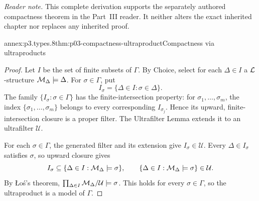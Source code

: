 \noindent\textit{Reader note.} This complete derivation supports the
separately authored compactness theorem in the Part~III reader.  It neither
alters the exact inherited chapter nor replaces any inherited proof.

\begin{annexitem}{annex:p3.types.8}{thm:p03-compactness-ultraproduct}{Compactness via ultraproducts}
\begin{proof}
Let \(I\) be the set of finite subsets of \(\Gamma\).  By Choice, select for
each \(\Delta\in I\) a \(\mathcal{L}\)-structure
\(\mathcal M_\Delta\models\Delta\).  For \(\sigma\in\Gamma\), put
\[
 I_\sigma=\{\Delta\in I:\sigma\in\Delta\}.
\]
The family \(\{I_\sigma:\sigma\in\Gamma\}\) has the finite-intersection
property: for \(\sigma_1,\ldots,\sigma_m\), the index
\(\{\sigma_1,\ldots,\sigma_m\}\) belongs to every corresponding
\(I_{\sigma_j}\).  Hence its upward, finite-intersection closure is a proper
filter.  The Ultrafilter Lemma extends it to an ultrafilter \(\mathcal U\).

For each \(\sigma\in\Gamma\), the generated filter and its extension give
\(I_\sigma\in\mathcal U\).  Every \(\Delta\in I_\sigma\) satisfies \(\sigma\),
so upward closure gives
\[
 I_\sigma\subseteq
 \{\Delta\in I:\mathcal M_\Delta\models\sigma\},
 \qquad
 \{\Delta\in I:\mathcal M_\Delta\models\sigma\}\in\mathcal U.
\]
By \L o\'s's theorem,
\(\prod_{\Delta\in I}\mathcal M_\Delta/\mathcal U\models\sigma\).
This holds for every \(\sigma\in\Gamma\), so the ultraproduct is a model of
\(\Gamma\).
\end{proof}
\end{annexitem}
